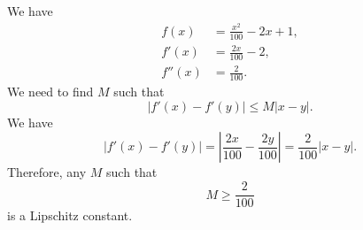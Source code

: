 
We have
\begin{align*}
  f(x) &= \frac{x^2}{100} -2x + 1,\\
  f'(x) &= \frac{2x}{100}-2,\\
  f''(x) &= \frac{2}{100}.
\end{align*}
We need to find $M$ such that
\[
|f'(x)-f'(y)| \leq M |x-y|.
\]
We have
\[
|f'(x)-f'(y)| = \left|\frac{2x}{100}-\frac{2y}{100}\right| = \frac{2}{100}|x-y|.
\]
Therefore, any $M$ such that
\[
M \geq \frac{2}{100}
\]
is a Lipschitz constant.



